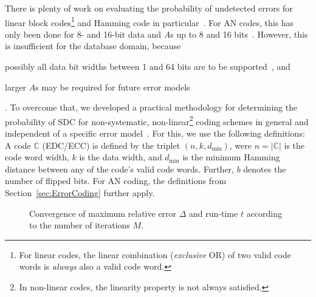 There is plenty of work on evaluating the probability of undetected errors for linear block codes\footnote{For linear codes, the linear combination (\emph{exclusive} OR) of two valid code words is \emph{always} also a valid code word.} and Hamming code in particular~\cite{KAUR19941141,Wolf1982,moon2005error}. For AN codes, this has only been done for 8- and 16-bit data and \(A\)s up to 8 and 16 bits~\cite{DBLP:conf/hase/HoffmannUDSLS14,coredExperiments}. However, this is insufficient for the database domain, because \begin{inparaenum} \item possibly all data bit widths between 1 and 64 bits are to be supported~\cite{willhalm2013vectorizing}, and \item larger \(A\)s may be required for future error models\end{inparaenum}. To overcome that, we developed a practical methodology for determining the probability of SDC for non-systematic, non-linear\footnote{In non-linear codes, the linearity property is not always satisfied.} coding schemes in general and independent of a specific error model~\cite{kolditz2018}. For this, we use the following definitions: A code \(\mathbb{C}\) (EDC/ECC) is defined by the triplet $(n, k, d_\text{min})$, were $n=|\mathbb{C}|$ is the code word width, $k$ is the data width, and $d_\text{min}$ is the minimum Hamming distance between any of the code's valid code words. Further, $b$ denotes the number of flipped bits. For AN coding, the definitions from Section~\ref{sec:ErrorCoding} further apply.
 



\begin{figure}[t]
	\centering
	{
		\graphicspath{{gnuplot/}}
		
	}
	\vspace{-2em}
	\caption{Convergence of maximum relative error $\Delta$ and run-time \(t\) according to the number of iterations $M$.}
	\label{fig:convergence}
	\vspace{-0.4cm}
\end{figure} 

